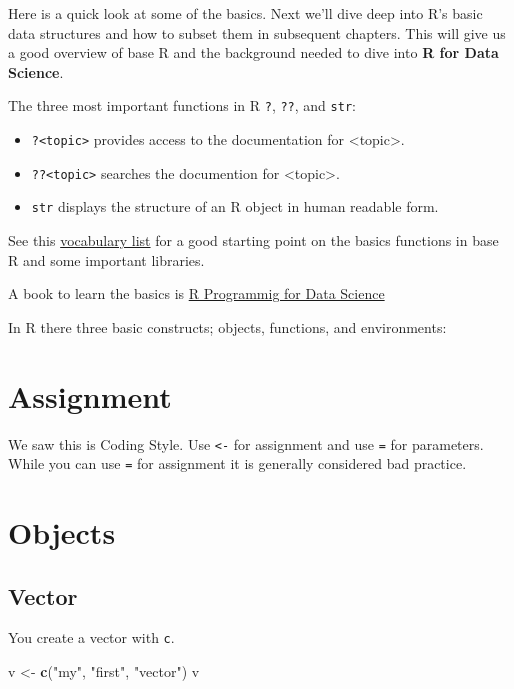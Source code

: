 \documentclass[]{book}
\newenvironment{Shaded}{\begin{snugshade}}{\end{snugshade}}
\newcommand{\KeywordTok}[1]{\textcolor[rgb]{0.13,0.29,0.53}{\textbf{#1}}}
\newcommand{\StringTok}[1]{\textcolor[rgb]{0.31,0.60,0.02}{#1}}
\newcommand{\NormalTok}[1]{#1}
\providecommand{\tightlist}{%
  \setlength{\itemsep}{0pt}\setlength{\parskip}{0pt}}
\theoremstyle{definition}
\theoremstyle{definition}
\theoremstyle{definition}
\theoremstyle{remark}
\begin{document}
Here is a quick look at some of the basics. Next we'll dive deep into
R's basic data structures and how to subset them in subsequent chapters.
This will give us a good overview of base R and the background needed to
dive into \textbf{R for Data Science}.

The three most important functions in R \texttt{?}, \texttt{??}, and
\texttt{str}:

\begin{itemize}
\tightlist
\item
  \texttt{?\textless{}topic\textgreater{}} provides access to the
  documentation for \textless{}topic\textgreater{}.
\item
  \texttt{??\textless{}topic\textgreater{}} searches the documention for
  \textless{}topic\textgreater{}.
\item
  \texttt{str} displays the structure of an R object in human readable
  form.
\end{itemize}

See this \href{http://adv-r.had.co.nz/Vocabulary.html}{vocabulary list}
for a good starting point on the basics functions in base R and some
important libraries.

A book to learn the basics is
\href{https://bookdown.org/rdpeng/rprogdatascience/}{R Programmig for
Data Science}

In R there three basic constructs; objects, functions, and environments:

\section{Assignment}\label{assignment}

We saw this is Coding Style. Use \texttt{\textless{}-} for assignment
and use \texttt{=} for parameters. While you can use \texttt{=} for
assignment it is generally considered bad practice.

\section{Objects}\label{objects}

\subsection{Vector}\label{vector}

You create a vector with \texttt{c}.

\begin{Shaded}
\begin{Highlighting}[]
\NormalTok{v <-}\StringTok{ }\KeywordTok{c}\NormalTok{(}\StringTok{"my"}\NormalTok{, }\StringTok{"first"}\NormalTok{, }\StringTok{"vector"}\NormalTok{)}
\NormalTok{v}
\end{Highlighting}
\end{Shaded}
\end{document}
